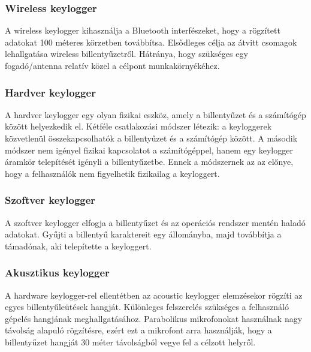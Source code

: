\documentclass[a4paper, 11pt]{article}
\begin{document}
\subsubsection{Wireless keylogger}
A wireless keylogger kihasználja a Bluetooth interfészeket, hogy a rögzített adatokat 100 méteres körzetben továbbítsa. Elsődleges célja az átvitt csomagok lehallgatása wireless billentyűzetről. Hátránya, hogy szükséges egy fogadó/antenna relatív közel a célpont munkakörnyékéhez.

\subsubsection{Hardver keylogger}
A hardver keylogger egy olyan fizikai eszköz, amely a billentyűzet és a számítógép között helyezkedik el. Kétféle csatlakozási módszer létezik: a keyloggerek közvetlenül összekapcsolhatók a billentyűzet és a számítógép között. A második módszer nem igényel fizikai kapcsolatot a számítógéppel, hanem egy keylogger áramkör telepítését igényli a billentyűzetbe. Ennek a módszernek az az előnye, hogy a felhasználók nem figyelhetik fizikailag a keyloggert.

\subsubsection{Szoftver keylogger}
A szoftver keylogger elfogja a billentyűzet és az operációs rendszer mentén haladó adatokat. Gyűjti a billentyű karaktereit egy állományba, majd továbbítja a támadónak, aki telepítette a keyloggert.

\subsubsection{Akusztikus keylogger}
A hardware keylogger-rel ellentétben az acoustic keylogger elemzésekor rögzíti az egyes billentyűleütések hangját. Különleges felszerelés szükséges a felhasználó gépelés hangjának meghallgatásához. Parabolikus mikrofonokat használnak nagy távolság alapuló rögzítésre, ezért ezt a mikrofont arra használják, hogy a billentyűzet hangját 30 méter távolságból vegye fel a célzott helyről.
\end{document}
